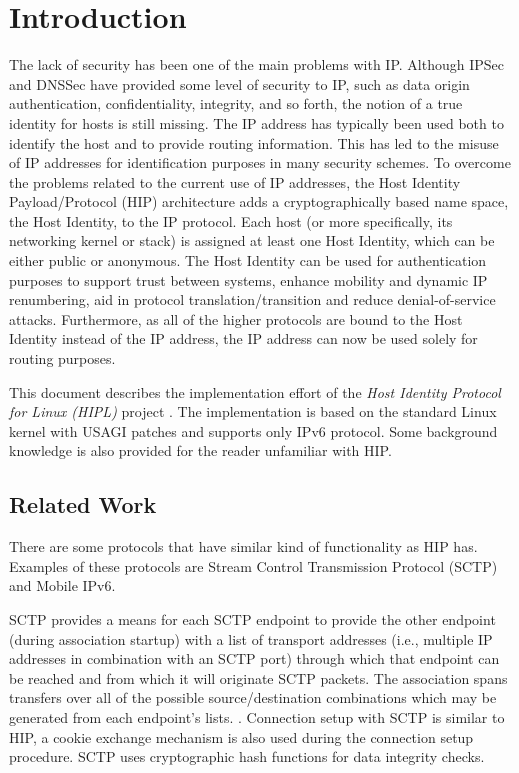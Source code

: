 \section{Introduction}
\label{sec:introduction}

The lack of security has been one of the main problems with
IP. Although IPSec \cite{rfc2401} and DNSSec \cite{rfc3008} have
provided some level of security to IP, such as data origin
authentication, confidentiality, integrity, and so forth, the notion
of a true identity for hosts is still missing. The IP address has
typically been used both to identify the host and to provide routing
information. This has led to the misuse of IP addresses for
identification purposes in many security schemes. To overcome the
problems related to the current use of IP addresses, the Host Identity
Payload/Protocol (HIP) architecture adds a cryptographically based
name space, the Host Identity, to the IP protocol.  Each host (or more
specifically, its networking kernel or stack) is assigned at least one
Host Identity, which can be either public or anonymous. The Host
Identity can be used for authentication purposes to support trust
between systems, enhance mobility and dynamic IP renumbering, aid in
protocol translation/transition and reduce denial-of-service
attacks. Furthermore, as all of the higher protocols are bound to the
Host Identity instead of the IP address, the IP address can now be
used solely for routing purposes.

This document describes the implementation effort of the \textit{Host
Identity Protocol for Linux (HIPL)} project \cite{hipl}. The
implementation is based on the standard Linux kernel with USAGI
patches and supports only IPv6 protocol. Some background knowledge is
also provided for the reader unfamiliar with HIP.

\subsection{Related Work}
\label{sec:related_work}

There are some protocols that have similar kind of functionality as
HIP has. Examples of these protocols are Stream Control Transmission
Protocol (SCTP) and Mobile IPv6.

SCTP provides a means for each SCTP endpoint to provide the other
endpoint (during association startup) with a list of transport
addresses (i.e., multiple IP addresses in combination with an SCTP
port) through which that endpoint can be reached and from which it
will originate SCTP packets. The association spans transfers over all
of the possible source/destination combinations which may be generated
from each endpoint's lists. \cite{rfc2960}. Connection setup with SCTP
is similar to HIP, a cookie exchange mechanism is also used during the
connection setup procedure. SCTP uses cryptographic hash functions for
data integrity checks.

